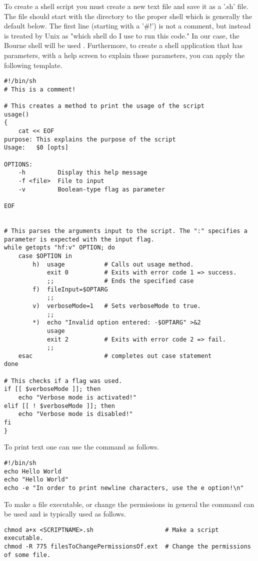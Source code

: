 To create a shell script you must create a new text file and save it as a '.sh' file. The file should start with the directory to the proper shell which is generally the default below. The first line (starting with a  '\#!') is not a comment, but instead is treated by Unix as "which shell do I use to run this code." In our case, the Bourne shell will be used \cite{linux: shell scripting}. Furthermore, to create a shell application that has parameters, with a help screen to explain those parameters, you can apply the following template.
\begin{lstlisting}
#!/bin/sh
# This is a comment!

# This creates a method to print the usage of the script
usage()
{
	cat << EOF
purpose: This explains the purpose of the script
Usage:   $0 [opts]

OPTIONS:
	-h         Display this help message
	-f <file>  File to input
	-v         Boolean-type flag as parameter
	
EOF


# This parses the arguments input to the script. The ":" specifies a parameter is expected with the input flag.
while getopts "hf:v" OPTION; do
	case $OPTION in
		h)	usage			# Calls out usage method.
			exit 0			# Exits with error code 1 => success.
			;;				# Ends the specified case
		f)	fileInput=$OPTARG
			;;
		v)	verboseMode=1	# Sets verboseMode to true.
			;;
		*)	echo "Invalid option entered: -$OPTARG" >&2
			usage
			exit 2			# Exits with error code 2 => fail.
			;;
	esac					# completes out case statement
done

# This checks if a flag was used.
if [[ $verboseMode ]]; then
	echo "Verbose mode is activated!"
elif [[ ! $verboseMode ]]; then
	echo "Verbose mode is disabled!"
fi
}
\end{lstlisting}

To print text one can use the  command as follows.
\begin{lstlisting}
#!/bin/sh
echo Hello World
echo "Hello World"
echo -e "In order to print newline characters, use the e option!\n"
\end{lstlisting}

To make a file executable, or change the permissions in general the  command can be used and is typically used as follows.
\begin{lstlisting}
chmod a+x <SCRIPTNAME>.sh					 # Make a script executable.
chmod -R 775 filesToChangePermissionsOf.ext  # Change the permissions of some file.
\end{lstlisting}

